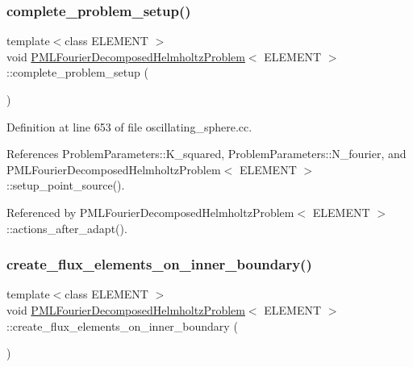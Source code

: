 \subsubsection{\texorpdfstring{complete\+\_\+problem\+\_\+setup()}{complete\_problem\_setup()}}
{\footnotesize\ttfamily template$<$class E\+L\+E\+M\+E\+NT $>$ \\
void \hyperlink{classPMLFourierDecomposedHelmholtzProblem}{P\+M\+L\+Fourier\+Decomposed\+Helmholtz\+Problem}$<$ E\+L\+E\+M\+E\+NT $>$\+::complete\+\_\+problem\+\_\+setup (\begin{DoxyParamCaption}{ }\end{DoxyParamCaption})}



Definition at line 653 of file oscillating\+\_\+sphere.\+cc.



References Problem\+Parameters\+::\+K\+\_\+squared, Problem\+Parameters\+::\+N\+\_\+fourier, and P\+M\+L\+Fourier\+Decomposed\+Helmholtz\+Problem$<$ E\+L\+E\+M\+E\+N\+T $>$\+::setup\+\_\+point\+\_\+source().



Referenced by P\+M\+L\+Fourier\+Decomposed\+Helmholtz\+Problem$<$ E\+L\+E\+M\+E\+N\+T $>$\+::actions\+\_\+after\+\_\+adapt().

\mbox{\label{classPMLFourierDecomposedHelmholtzProblem_afd6e3401bdbd1d3deb3271553fbe1d3a}} 
\subsubsection{\texorpdfstring{create\+\_\+flux\+\_\+elements\+\_\+on\+\_\+inner\+\_\+boundary()}{create\_flux\_elements\_on\_inner\_boundary()}}
{\footnotesize\ttfamily template$<$class E\+L\+E\+M\+E\+NT $>$ \\
void \hyperlink{classPMLFourierDecomposedHelmholtzProblem}{P\+M\+L\+Fourier\+Decomposed\+Helmholtz\+Problem}$<$ E\+L\+E\+M\+E\+NT $>$\+::create\+\_\+flux\+\_\+elements\+\_\+on\+\_\+inner\+\_\+boundary (\begin{DoxyParamCaption}{ }\end{DoxyParamCaption})\hspace{0.3cm}{\ttfamily [private]}}



